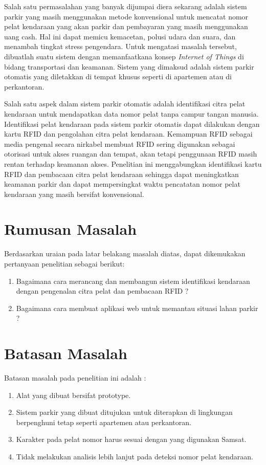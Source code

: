 Salah satu permasalahan yang banyak dijumpai diera sekarang adalah sistem parkir yang masih menggunakan metode konvensional untuk mencatat nomor pelat kendaraan yang akan parkir dan pembayaran yang masih menggunakan uang cash. Hal ini dapat memicu kemacetan, polusi udara dan suara, dan menambah tingkat stress pengendara. Untuk mengatasi masalah tersebut, dibuatlah suatu sistem dengan memanfaatkana konsep \textit{Internet of Things} di bidang transportasi dan keamanan. Sistem yang dimaksud adalah sistem parkir otomatis yang diletakkan di tempat khusus seperti di apartemen atau di perkantoran.

Salah satu aspek dalam sistem parkir otomatis adalah identifikasi citra pelat kendaraan untuk mendapatkan data nomor pelat tanpa campur tangan manusia. Identifikasi pelat kendaraan pada sistem parkir otomatis dapat dilakukan dengan kartu RFID dan pengolahan citra pelat kendaraan. Kemampuan RFID sebagai media pengenal secara nirkabel membuat RFID sering digunakan sebagai otorisasi untuk akses ruangan dan tempat, akan tetapi penggunaan RFID masih rentan terhadap keamanan akses. Penelitian ini menggabungkan identifikasi kartu RFID dan pembacaan citra pelat kendaraan sehingga dapat meningkatkan keamanan parkir dan dapat mempersingkat waktu pencatatan nomor pelat kendaraan yang masih bersifat konvensional.

\section{Rumusan Masalah}
Berdasarkan uraian pada latar belakang masalah diatas, dapat dikemukakan pertanyaan penelitian sebagai berikut:
\begin{enumerate}[topsep=0pt,itemsep=0pt,partopsep=0pt, parsep=0pt]
    \item Bagaimana cara merancang dan membangun sistem identifikasi kendaraan dengan pengenalan citra pelat dan pembacaan RFID ?
    \item Bagaimana cara membuat aplikasi web untuk memantau situasi lahan parkir ?
\end{enumerate}

\section{Batasan Masalah}
Batasan masalah pada penelitian ini adalah :
\begin{enumerate}[topsep=0pt,itemsep=0pt,partopsep=0pt, parsep=0pt]
    \item Alat yang dibuat bersifat prototype.
    \item Sistem parkir yang dibuat ditujukan untuk diterapkan di lingkungan berpenghuni tetap seperti apartemen atau perkantoran.
    \item Karakter pada pelat nomor harus sesuai dengan yang digunakan Samsat.
    \item Tidak melakukan analisis lebih lanjut pada deteksi nomor pelat kendaraan.
\end{enumerate}

